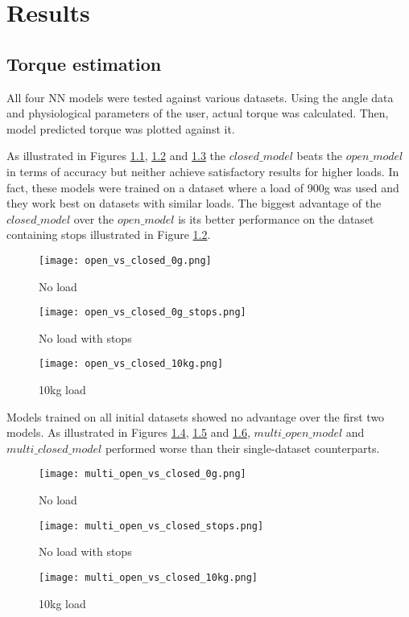 \chapter{Results}

\section{Torque estimation}
All four NN models were tested against various datasets. Using the angle data and 
physiological parameters of the user, actual torque was calculated. Then, model 
predicted torque was plotted against it.  

As illustrated in Figures \ref{fig:ovc0g}, \ref{fig:ovc0gstops} and \ref{fig:ovc10kg} 
the $closed\_model$ beats the $open\_model$ in terms of accuracy but neither 
achieve satisfactory results for higher loads. In fact, these models were trained 
on a dataset where a load of 900g was used and they work best on datasets with 
similar loads. The biggest advantage of the $closed\_model$ over the $open\_model$ 
is its better performance on the dataset containing stops illustrated in Figure 
\ref{fig:ovc0gstops}.  
\begin{figure}[htbp]
  \centering
  \texttt{[image: open\_vs\_closed\_0g.png]}
  \caption{No load}
  \label{fig:ovc0g}
\end{figure}
\begin{figure}[htbp]
  \centering
  \texttt{[image: open\_vs\_closed\_0g\_stops.png]}
  \caption{No load with stops}
  \label{fig:ovc0gstops}
\end{figure}
\begin{figure}[htbp]
  \centering
  \texttt{[image: open\_vs\_closed\_10kg.png]}
  \caption{10kg load}
  \label{fig:ovc10kg}
\end{figure}

Models trained on all initial datasets showed no advantage over the first two 
models. As illustrated in Figures \ref{fig:movc0g}, \ref{fig:movcstops} and \ref{fig:movc10kg}, 
$multi\_open\_model$ and $multi\_closed\_model$ performed worse than their 
single-dataset counterparts.  

\begin{figure}[htbp]
  \centering
  \texttt{[image: multi\_open\_vs\_closed\_0g.png]}
  \caption{No load}
  \label{fig:movc0g}
\end{figure}
\begin{figure}[htbp]
  \centering
  \texttt{[image: multi\_open\_vs\_closed\_stops.png]}
  \caption{No load with stops}
  \label{fig:movcstops}
\end{figure}
\begin{figure}[htbp]
  \centering
  \texttt{[image: multi\_open\_vs\_closed\_10kg.png]}
  \caption{10kg load}
  \label{fig:movc10kg}
\end{figure}
\FloatBarrier

